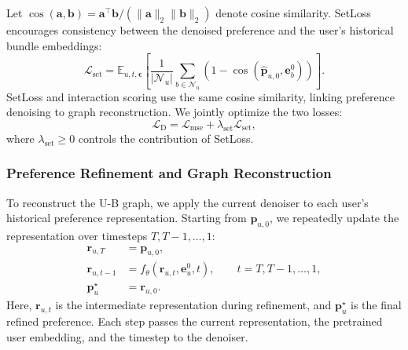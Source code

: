 \documentclass[letterpaper]{article}
\begin{document}
Let $\cos(\mathbf a,\mathbf b)=\mathbf a^\top\mathbf b/(\|\mathbf a\|_2\|\mathbf b\|_2)$ denote cosine similarity. SetLoss encourages consistency between the denoised preference and the user's historical bundle embeddings:
\begin{equation}
\mathcal L_{\mathrm{set}}
=\mathbb E_{u,t,\boldsymbol\epsilon}
\left[
\frac{1}{|\mathcal N_u|}
\sum_{b\in\mathcal N_u}
\left(1-\cos
\left(\widehat{\mathbf p}_{u,0},\mathbf e_b^0\right)\right)
\right].
\tag{7}
\end{equation}
SetLoss and interaction scoring use the same cosine similarity, linking preference denoising to graph reconstruction. We jointly optimize the two losses:
\begin{equation}
\mathcal L_{\mathrm D}
=\mathcal L_{\mathrm{mse}}
+\lambda_{\mathrm{set}}\mathcal L_{\mathrm{set}},
\tag{8}
\end{equation}
where $\lambda_{\mathrm{set}}\geq 0$ controls the contribution of SetLoss.

\subsubsection{Preference Refinement and Graph Reconstruction}

To reconstruct the U-B graph, we apply the current denoiser to each user's historical preference representation. Starting from $\mathbf p_{u,0}$, we repeatedly update the representation over timesteps $T,T-1,\ldots,1$:
\begin{equation}
\begin{aligned}
\mathbf r_{u,T}&=\mathbf p_{u,0},\\
\mathbf r_{u,t-1}
&=f_\theta(\mathbf r_{u,t},\mathbf e_u^0,t),
\qquad t=T,T-1,\ldots,1,\\
\mathbf p_u^\star&=\mathbf r_{u,0}.
\end{aligned}
\tag{9}
\end{equation}
Here, $\mathbf r_{u,t}$ is the intermediate representation during refinement, and $\mathbf p_u^\star$ is the final refined preference. Each step passes the current representation, the pretrained user embedding, and the timestep to the denoiser.
\end{document}
